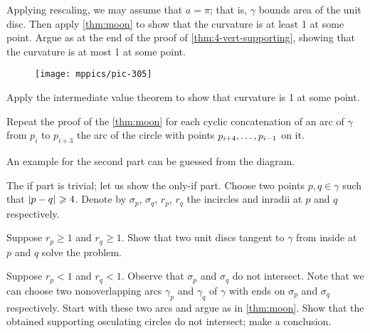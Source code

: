 \begin{multicols}{2}
Applying rescaling, we may assume that $a=\pi$; that is, $\gamma$ bounds area of the unit disc.
Then apply \ref{thm:moon} to show that the curvature is at least 1 at some point.
Argue as at the end of the proof of \ref{thm:4-vert-supporting}, showing that the curvature is at most 1 at some point.

\begin{wrapfigure}{r}{20 mm}
\vskip-6mm
\centering
\texttt{[image: mppics/pic-305]}
\vskip-2mm
\end{wrapfigure}


Apply the intermediate value theorem to show that curvature is  1 at some point.

Repeat the proof of the \ref{thm:moon} for each cyclic concatenation of an arc of $\gamma$ from $p_i$ to $p_{i+3}$ the arc of the circle with points $p_{i+4},\z\dots,p_{i-1}$ on it.

An example for the second part can be guessed from the diagram.





The if part is trivial; let us show the only-if part.
Choose two points $p,q\in\gamma$ such that $\dist{p}{q}{}\ge 4$.
Denote by $\sigma_p$, $\sigma_q$, $r_p$, $r_q$ the incircles and inradii at $p$ and $q$ respectively.

Suppose $r_p\ge 1$ and $r_q\ge1$.
Show that two unit discs tangent to $\gamma$ from inside at $p$ and $q$ solve the problem.

Suppose $r_p< 1$ and $r_q<1$.
Observe that $\sigma_p$ and $\sigma_q$ do not intersect.
Note that we can choose two nonoverlapping arcs $\gamma_p$ and $\gamma_q$ of $\gamma$ with ends on  $\sigma_p$ and $\sigma_q$ respectively.
Start with these two arcs and argue as in \ref{thm:moon}.
Show that the obtained supporting osculating circles do not intersect;
make a conclusion.


\end{multicols}
